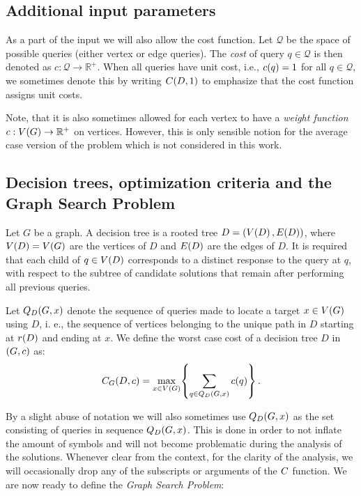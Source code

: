 \subsection{Additional input parameters}
\label{subsec:additional_input_parameters}
As a part of the input we will also allow the cost function. Let $\mathcal{Q}$ be the space of possible queries (either vertex or edge queries). The \textit{cost} of query $q\in\mathcal{Q}$ is then denoted
as $c:\mathcal{Q}\to \mathbb{R}^+$. When all queries have unit cost, i.e., $c\mathopen{}\left( q \right)=1$ for all $q\in\mathcal{Q}$, we sometimes denote this by writing $C\mathopen{}\left( D,1 \right)$ to emphasize that the cost function assigns unit costs.

Note, that it is also sometimes allowed for each vertex to have a \textit{weight function} $c:V\mathopen{}\left( G \right)\to \mathbb{R}^+$ on vertices. However, this is only sensible notion for the average case version of the problem which is not considered in this work.
\subsection{Decision trees, optimization criteria and the Graph Search Problem}
\label{subsec:decision_trees}
Let $G$ be a graph. A decision tree is a rooted tree $D=(V\mathopen{}\left( D \right), E\mathopen{}\left( D \right))$, where $V\mathopen{}\left( D \right)=V\mathopen{}\left( G \right)$ are the vertices of $D$ and $E\mathopen{}\left( D \right)$ are the edges of $D$. It is required that each child of $q\in V\mathopen{}\left( D \right)$ corresponds to a distinct response to the query at $q$, with respect to the subtree of candidate solutions that remain after performing all previous queries. 

Let $Q_D\mathopen{}\left( G,x \right)$ denote the sequence of queries made to locate a target $x \in V\mathopen{}\left( G \right)$ using $D$, i. e., the sequence of vertices belonging to the unique path in $D$ starting at $r\mathopen{}\left( D \right)$ and ending at $x$. We define the worst case cost of a decision tree $D$ in $\mathopen{}\left( G,c \right)$ as:
$$
C_{G}\mathopen{}\left( D, c \right) = \max_{x\in V\mathopen{}\left( G \right)} \mathopen{}\left\{ \sum_{q\in Q_D\mathopen{}\left( G, x \right)}c\mathopen{}\left( q \right) \right\}.
$$


By a slight abuse of notation we will also sometimes use $Q_D\mathopen{}\left( G,x \right)$ as the set consisting of queries in sequence $Q_D\mathopen{}\left( G,x \right)$. This is done in order to not inflate the amount of symbols and will not become problematic during the analysis of the solutions.
Whenever clear from the context, for the clarity of the analysis, we will occasionally drop any of the subscripts or arguments of the $C$ function.
We are now ready to define the \textit{Graph Search Problem}:

